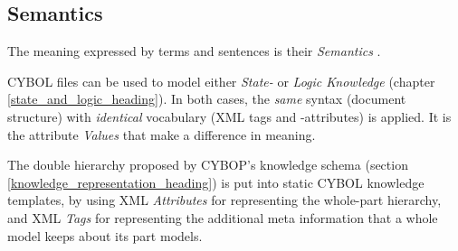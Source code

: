 %
%
%
%
%
%
%

\subsection{Semantics}
\label{semantics_heading}

The meaning expressed by terms and sentences is their \emph{Semantics}
\cite{duden}.

CYBOL files can be used to model either \emph{State-} or \emph{Logic Knowledge}
(chapter \ref{state_and_logic_heading}). In both cases, the \emph{same} syntax
(document structure) with \emph{identical} vocabulary (XML tags and -attributes)
is applied. It is the attribute \emph{Values} that make a difference in meaning.

The double hierarchy proposed by CYBOP's knowledge schema (section
\ref{knowledge_representation_heading}) is put into static CYBOL knowledge
templates, by using XML \emph{Attributes} for representing the whole-part
hierarchy, and XML \emph{Tags} for representing the additional meta information
that a whole model keeps about its part models.



